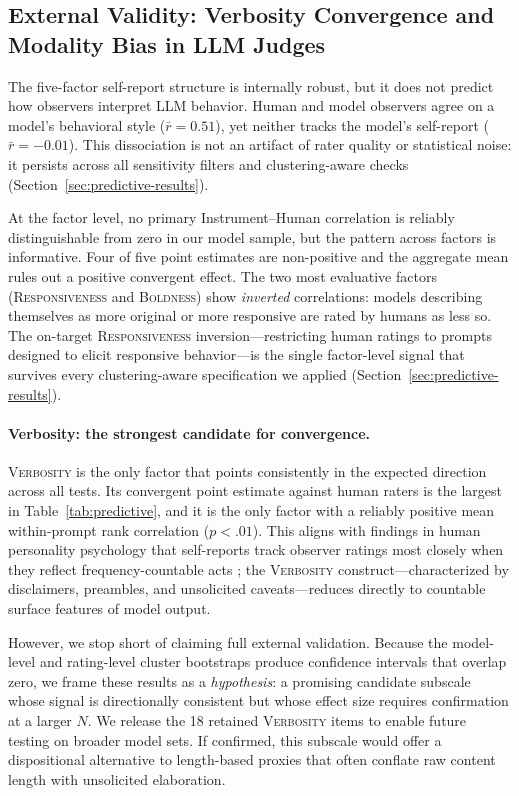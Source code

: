 \documentclass[11pt]{article}
\newcommand{\factorname}[1]{\textsc{#1}}
\begin{document}
\subsection{External Validity: Verbosity Convergence and Modality Bias in LLM Judges}
\label{sec:discussion-external-validity}

The five-factor self-report structure is internally robust, but it does not predict how observers interpret LLM behavior. Human and model observers agree on a model's behavioral style ($\bar{r} = 0.51$), yet neither tracks the model's self-report ($\bar{r} = -0.01$). This dissociation is not an artifact of rater quality or statistical noise: it persists across all sensitivity filters and clustering-aware checks (Section~\ref{sec:predictive-results}).

At the factor level, no primary Instrument--Human correlation is reliably distinguishable from zero in our model sample, but the pattern across factors is informative.
Four of five point estimates are non-positive and the aggregate mean rules out a positive convergent effect. The two most evaluative factors (\factorname{Responsiveness} and \factorname{Boldness}) show \emph{inverted} correlations: models describing themselves as more original or more responsive are rated by humans as less so.
The on-target \factorname{Responsiveness} inversion---restricting human ratings to prompts designed to elicit responsive behavior---is the single factor-level signal that survives every clustering-aware specification we applied (Section~\ref{sec:predictive-results}).

\paragraph{Verbosity: the strongest candidate for convergence.}
\factorname{Verbosity} is the only factor that points consistently in the expected direction across all tests. Its convergent point estimate against human raters is the largest in Table~\ref{tab:predictive}, and it is the only factor with a reliably positive mean within-prompt rank correlation ($p < .01$). This aligns with findings in human personality psychology that self-reports track observer ratings most closely when they reflect frequency-countable acts \citep{funder1995accuracy}; the \factorname{Verbosity} construct---characterized by disclaimers, preambles, and unsolicited caveats---reduces directly to countable surface features of model output.

However, we stop short of claiming full external validation. Because the model-level and rating-level cluster bootstraps produce confidence intervals that overlap zero, we frame these results as a \emph{hypothesis}: a promising candidate subscale whose signal is directionally consistent but whose effect size requires confirmation at a larger $N$. We release the 18 retained \factorname{Verbosity} items to enable future testing on broader model sets. If confirmed, this subscale would offer a dispositional alternative to length-based proxies \citep{saito2023verbositybiaspreferencelabeling} that often conflate raw content length with unsolicited elaboration.
\end{document}
